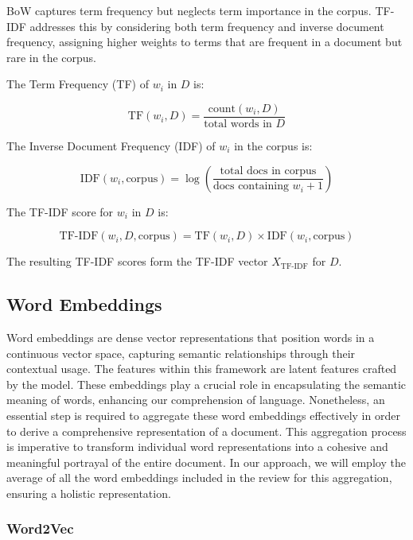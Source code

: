 BoW captures term frequency but neglects term importance in the corpus. TF-IDF addresses this by considering both term frequency and inverse document frequency, assigning higher weights to terms that are frequent in a document but rare in the corpus.

The Term Frequency (TF) of $w_i$ in $D$ is:

\[
\text{TF}(w_i, D) = \frac{\text{count}(w_i, D)}{\text{total words in } D}
\]

The Inverse Document Frequency (IDF) of $w_i$ in the corpus is:

\[
\text{IDF}(w_i, \text{corpus}) = \log\left(\frac{\text{total docs in corpus}}{\text{docs containing } w_i + 1}\right)
\]

The TF-IDF score for $w_i$ in $D$ is:

\[
\text{TF-IDF}(w_i, D, \text{corpus}) = \text{TF}(w_i, D) \times \text{IDF}(w_i, \text{corpus})
\]

The resulting TF-IDF scores form the TF-IDF vector $X_{\text{TF-IDF}}$ for $D$.












\subsection{Word Embeddings}

Word embeddings are dense vector representations that position words in a continuous vector space, capturing semantic relationships through their contextual usage. The features within this framework are latent features crafted by the model.
These embeddings play a crucial role in encapsulating the semantic meaning of words, enhancing our comprehension of language.
Nonetheless, an essential step is required to aggregate these word embeddings effectively in order to derive a comprehensive representation of a document. This aggregation process is imperative to transform individual word representations into a cohesive and meaningful portrayal of the entire document. In our approach, we will employ the average of all the word embeddings included in the review for this aggregation, ensuring a holistic representation.



\subsubsection{Word2Vec}

